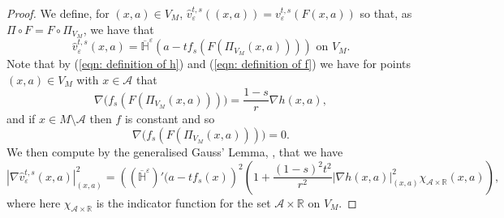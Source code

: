 \documentclass[11pt]{article}
\begin{document}
\begin{proof}
We define, for $(x,a) \in V_M$, $\hat{v}^{t,s}_\varepsilon ((x,a)) = v^{t,s}_\varepsilon (F(x,a))$ so that, as $\Pi \circ F = F \circ \Pi_{V_M}$, we have that
\begin{equation}\label{eqn: shifting functions on cylinder}
    \hat{v}^{t,s}_\varepsilon(x,a) = \overline{\mathbb{H}}^\varepsilon(a - tf_s(F(\Pi_{V_M}(x,a)))) \text{ on } V_M.
\end{equation}
Note that by (\ref{eqn: definition of h}) and (\ref{eqn: definition of f}) we have for points $(x,a) \in V_M$ with $x \in \mathcal{A}$ that 
\begin{equation*}
   \nabla \big(f_s(F(\Pi_{V_M}(x,a)))\big) = \frac{1-s}{r}\nabla h(x,a),
\end{equation*} 
and if $x \in M \setminus \mathcal{A}$ then $f$ is constant and so 
\begin{equation*}
    \nabla \big(f_s(F(\Pi_{V_M}(x,a)))\big) = 0.
\end{equation*}
We then compute by the generalised Gauss' Lemma, \cite[Chapter 2.4]{tubes}, that we have
\begin{equation}\label{eqn: Gauss lemma on shifting functions}
    |\nabla \hat{v}^{t,s}_\varepsilon(x,a)|_{(x,a)}^2 = \left((\overline{\mathbb{H}}^\varepsilon)'(a - tf_s(x)\right)^2 \left(1 + \frac{(1-s)^2t^2}{r^2}|\nabla h(x,a)|_{(x,a)}^2 \chi_{\mathcal{A} \times \mathbb{R}}(x,a)\right),
\end{equation}
where here $\chi_{\mathcal{A} \times
\mathbb{R}}$ is the indicator function for the set $\mathcal{A} \times
\mathbb{R}$ on $V_M$.

\bigskip


\end{proof}
\end{document}
